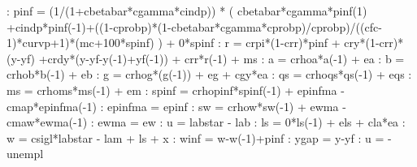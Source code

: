 \documentclass{article}%
\begin{document}
   :  pinf =  (1/(1+cbetabar*cgamma*cindp)) * ( cbetabar*cgamma*pinf(1) +cindp*pinf({-}1)+((1{-}cprobp)*(1{-}cbetabar*cgamma*cprobp)/cprobp)/((cfc{-}1)*curvp+1)*(mc+100*spinf)  )  + 0*spinf\newline%
   :  r =  crpi*(1{-}crr)*pinf + cry*(1{-}crr)*(y{-}yf) +crdy*(y{-}yf{-}y({-}1)+yf({-}1)) + crr*r({-}1) + ms\newline%
   :  a = crhoa*a({-}1)  + ea\newline%
   :  b = crhob*b({-}1) + eb\newline%
   :  g = crhog*(g({-}1)) + eg + cgy*ea\newline%
   :  qs = crhoqs*qs({-}1) + eqs\newline%
   :  ms = crhoms*ms({-}1) + em\newline%
   :  spinf = crhopinf*spinf({-}1) + epinfma {-} cmap*epinfma({-}1)\newline%
   :  epinfma = epinf\newline%
   :  sw = crhow*sw({-}1) + ewma {-} cmaw*ewma({-}1)\newline%
   :  ewma = ew\newline%
   :  u = labstar {-} lab\newline%
   :  ls = 0*ls({-}1) + els + cla*ea\newline%
   :  w = csigl*labstar {-} lam + ls + x\newline%
   :  winf = w{-}w({-}1)+pinf\newline%
   :  ygap = y{-}yf\newline%
   :  u = {-}unempl\newline%

%
\end{document}
